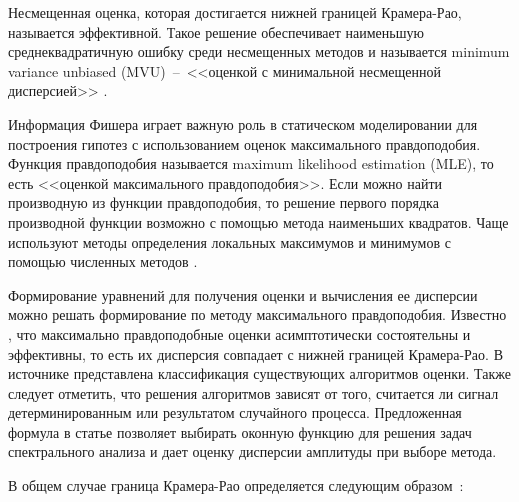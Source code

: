 Несмещенная оценка, которая достигается нижней границей Крамера-Рао, называется эффективной. Такое решение обеспечивает наименьшую среднеквадратичную ошибку среди несмещенных методов и называется minimum variance unbiased (MVU)~--~<<оценкой с минимальной несмещенной дисперсией>> \cite{altman2020boundary}.

Информация Фишера играет важную роль в статическом моделировании для построения гипотез с использованием оценок максимального правдоподобия. Функция правдоподобия называется maximum likelihood estimation (MLE), то есть <<оценкой максимального правдоподобия>>. Если можно найти производную из функции правдоподобия, то решение первого порядка производной функции возможно с помощью метода наименьших квадратов. Чаще используют методы определения локальных максимумов и минимумов с помощью численных методов \cite{press1992art}.


Формирование уравнений для получения оценки и вычисления ее дисперсии можно решать формирование по методу максимального правдоподобия. Известно \cite{kay1993fundamentals}, что максимально правдоподобные оценки асимптотически состоятельны и эффективны, то есть их дисперсия совпадает с нижней границей Крамера-Рао. В источнике \cite{kay2013fundamentals} представлена классификация существующих алгоритмов оценки. Также следует отметить, что решения алгоритмов зависят от того, считается ли сигнал детерминированным или результатом случайного процесса. Предложенная формула в статье позволяет выбирать оконную функцию для решения задач спектрального анализа и дает оценку дисперсии амплитуды при выборе метода.

В общем случае граница Крамера-Рао определяется следующим образом~\cite{kay1993fundamentals, kay2013fundamentals}:

